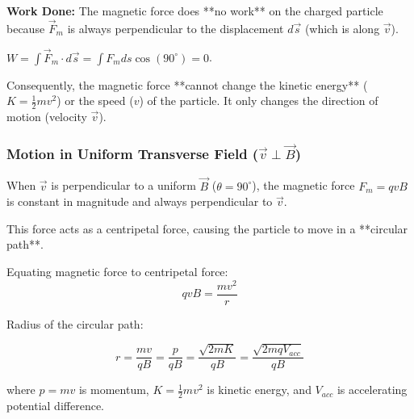 \begin{frame}[t]
      \item<+-> \textbf{Work Done:} The magnetic force does **no work** on the charged particle because $\vec{F}_m$ is always perpendicular to the displacement $d\vec{s}$ (which is along $\vec{v}$).
      \item<+-> $W = \int \vec{F}_m \cdot d\vec{s} = \int F_m ds \cos(90^\circ) = 0$.
      \item<+-> Consequently, the magnetic force **cannot change the kinetic energy** ($K = \frac{1}{2}mv^2$) or the speed ($v$) of the particle.   It only changes the direction of motion (velocity $\vec{v}$).
\end{frame}

\transfade[duration=0.5]

\begin{frame}[t]
    \frametitle{\textcolor{deepnavy}{\textbf{Motion in Uniform Transverse Field ($\vec{v} \perp \vec{B}$)}} }
    \renewcommand{\familydefault}{\rmdefault}
    \small

      \item<+-> When $\vec{v}$ is perpendicular to a uniform $\vec{B}$ ($\theta=90^\circ$), the magnetic force $F_m = qvB$ is constant in magnitude and always perpendicular to $\vec{v}$.
      \item<+-> This force acts as a centripetal force, causing the particle to move in a **circular path**.

      \item<+-> Equating magnetic force to centripetal force:
          \begin{equation*} qvB = \frac{mv^2}{r} \end{equation*}
      \item<+-> Radius of the circular path:
        \begin{tcolorbox}[colback=blue!5,colframe=blue!80,boxrule=0.5pt,arc=1mm,boxsep=1pt]
        \begin{equation*}
             r = \frac{mv}{qB} = \frac{p}{qB} = \frac{\sqrt{2m K}}{qB} = \frac{\sqrt{2mqV_{acc}}}{qB}
        \end{equation*}
        \end{tcolorbox}
          where $p=mv$ is momentum, $K = \frac{1}{2}mv^2$ is kinetic energy, and $V_{acc}$ is accelerating potential difference.


\end{frame}
